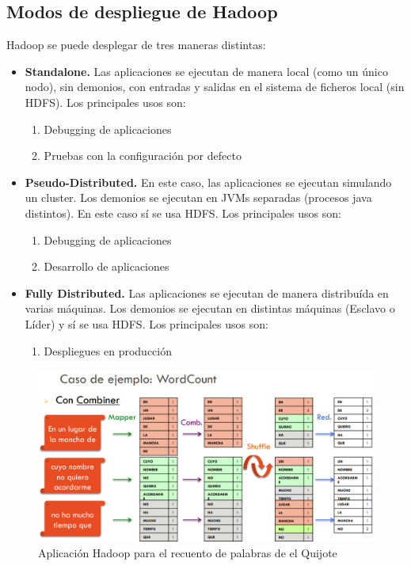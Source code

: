 \subsection{Modos de despliegue de Hadoop}
Hadoop se puede desplegar de tres maneras distintas:
\begin{itemize}
	\item \textbf{Standalone.} Las aplicaciones se ejecutan de manera local (como un único nodo), sin demonios, con entradas y salidas en el sistema de ficheros local (sin HDFS). Los principales usos son:
	\begin{enumerate}
		\item Debugging de aplicaciones
		\item Pruebas con la configuración por defecto
	\end{enumerate}
	\item \textbf{Pseudo-Distributed.} En este caso, las aplicaciones se ejecutan simulando un cluster. Los demonios se ejecutan en JVMs separadas (procesos java distintos). En este caso sí se usa HDFS. Los principales usos son:
	\begin{enumerate}
		\item Debugging de aplicaciones
		\item Desarrollo de aplicaciones
	\end{enumerate}
	\item \textbf{Fully Distributed.} Las aplicaciones se ejecutan de manera distribuída en varias máquinas. Los demonios se ejecutan en distintas máquinas (Esclavo o Líder) y sí se usa HDFS. Los principales usos son:
		\begin{enumerate}
		\item Despliegues en producción
		\end{enumerate}
\end{itemize}
\begin{figure}
	\includegraphics[width=1\linewidth]{figures/MapReduce_example}
\caption{Aplicación Hadoop para el recuento de palabras de el Quijote}
\label{fig:mapreduceexample}
\end{figure}
\break

